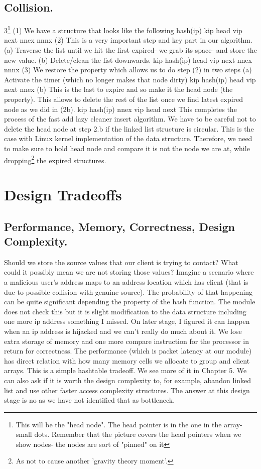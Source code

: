 \subsection{Collision.}
3\footnote{This will be the "head node". The head pointer is in the one in the array- small dots. Remember
that the picture covers the head pointers when we show nodes- the nodes are sort of "pinned" on
it}
(1) We have a structure that looks like the following
hash(ip)
kip
head
vip
next
nnex
nnnx
(2) This is a very important step and key part in our algorithm.
(a) Traverse the list until we hit the first expired- we grab its space- and
store the new value.
(b) Delete/clean the list downwards.
kip
hash(ip)
head
vip
next
nnex
nnnx
(3) We restore the property which allows us to do step (2) in two steps
(a) Activate the timer (which no longer makes that node dirty)
kip
hash(ip)
head
vip
next
nnex
(b) This is the last to expire and so make it the head node (the property).
This allows to delete the rest of the list once we find latest expired
node as we did in (2b).
kip
hash(ip)
nnex
vip
head
next
This completes the process of the fast add lazy cleaner insert algorithm.
We have to be careful not to delete the head node at step 2.b if the linked list
structure is circular. This is the case with Linux kernel implementation of the data
structure. Therefore, we need to make sure to hold head node and compare it is
not the node we are at, while dropping\footnote{As not to cause another 'gravity theory moment'.} the expired structures.
\section{Design Tradeoffs}
\subsection{Performance, Memory, Correctness, Design Complexity.} Should
we store the source values that our client is trying to contact? What could it possibly mean we are not storing those values? Imagine a scenario where a malicious
user's address maps to an address location which has client (that is due to possible
collision with genuine source). The probability of that happening can be quite significant depending the property of the hash function. The module does not check
this but it is slight modification to the data structure including one more ip address something I missed. On later stage, I figured it can happen when an ip address is hijacked and we can't really do much about it. We lose extra storage of memory and one more compare
instruction for the processor in return for correctness.
The performance (which is packet latency at our module) has direct relation
with how many memory cells we allocate to group and client arrays. This is a
simple hashtable tradeoff. We see more of it in Chapter 5.
We can also ask if it is worth the design complexity to, for example, abandon
linked list and use other faster access complexity structures. The answer at this
design stage is no as we have not identified that as bottleneck.

